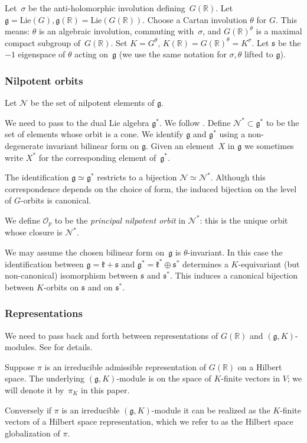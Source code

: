 \documentclass[10pt,leqno]{article}
\numberwithin{equation}{section}
\renewcommand{\O}{\mathcal O}
\newcommand{\R}{\mathbb R}
\newcommand{\N}{\mathcal N}
\newcommand{\Lie}{\mathrm{Lie}}
\newcommand{\g}{\mathfrak g}
\newcommand{\s}{\mathfrak s}
\begin{document}
Let~$\sigma$ be the anti-holomorphic involution defining~$G(\R)$.
Let $\g=\Lie(G), \g(\R)=\Lie(G(\R))$. 
Choose a Cartan involution $\theta$ for $G$. This means:
$\theta$ is an algebraic involution, commuting with~$\sigma$,
and $G(\R)^\theta$ is a maximal compact subgroup of~$G(\R)$. Set $K=G^\theta$, $K(\R)=G(\R)^\theta=K^\sigma$.
Let $\s$ be the $-1$ eigenspace of $\theta$ acting on~$\g$
(we use the same notation for $\sigma,\theta$ lifted to $\g$). 

\subsubsection*{Nilpotent orbits} 
\label{s:nilpotentorbits}
Let $\N$ be the set of nilpotent elements of $\g$. 

We need to pass to the dual Lie algebra $\g^*$. We follow  \cite[Section 2]{AVAV}.
Define $\N^*\subset \g^*$ to be the set of elements whose orbit is a cone.
We identify $\g$ and $\g^*$ using  a non-degenerate invariant bilinear form on $\g$. Given an element~$X$ in $\g$ we sometimes write $X^\ast$ for the corresponding element of~$\g^\ast$. 

The identification $\g \simeq \g^\ast$ restricts to a bijection $\N\simeq \N^*$. Although this correspondence depends on the choice of form,
the induced bijection on the level of $G$-orbits is canonical.

We define $\O_p$ to be the \emph{principal nilpotent orbit} in $\N^*$: this is the unique orbit whose closure is  $\N^*$.

We may assume the chosen bilinear form on~$\g$ is $\theta$-invariant. In this case the identification between $\g=\mathfrak k+\s$ and $\g^*=\mathfrak k^*\oplus \s^*$ determines a $K$-equivariant  (but non-canonical) isomorphism between $\s$ and $\s^\ast$. This induces
a canonical bijection between $K$-orbits on $\s$ and on $\s^*$.


\subsubsection*{Representations} 
We need to pass back and forth between representations of $G(\R)$ and $(\g,K)$-modules.
See \cite{greenbook} for details.

Suppose $\pi$ is an irreducible admissible representation of $G(\R)$  on a Hilbert space. 
The underlying
$(\g,K)$-module is on the space of $K$-finite vectors in
$V$; we will denote it by~$\pi_K$ in this paper. 

Conversely if $\pi$ is an irreducible $(\g,K)$-module it can be
realized as the $K$-finite vectors of a Hilbert space representation, which we
refer to as the Hilbert space globalization of $\pi$.
\end{document}
